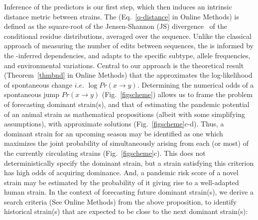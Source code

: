 \documentclass[onecolumn, compsoc,10pt]{IEEEtran}
\def\METHODS{Online Methods\xspace}
\begin{document}
Inference of the \enet predictors is our first step, which then induces  an intrinsic distance metric between strains. The \qdist  (Eq.~\eqref{q-distance} in \METHODS) is defined as the square-root of the Jensen-Shannon (JS) divergence~\cite{cover} of the conditional residue distributions, averaged over the sequence. Unlike the classical approach of measuring the number of edits between sequences, the \qdist is informed by the \enet-inferred  dependencies, and adapts to the specific subtype, allele frequencies, and environmental variations. Central to our approach is the theoretical result (Theorem~\ref{thmbnd} in \METHODS) that the \qdist  approximates the log-likelihood of spontaneous change $i.e.$ $\log Pr(x \rightarrow y )$. %
Determining the numerical odds of a spontaneous jump $ Pr(x \rightarrow y)$ (Fig.~\ref{figscheme}) allows us to frame the problem of forecasting  dominant strain(s), and that of estimating the  pandemic potential of an animal strain as  mathematical propositions (albeit with some simplifying assumptions), with  approximate solutions (Fig.~\ref{figscheme}c-d). Thus,  a dominant strain for an upcoming  season may be identified as one which maximizes the joint probability of simultaneously arising from each (or most)  of the currently circulating strains (Fig.~\ref{figscheme}c).  This does not deterministically specify the dominant strain, but a strain satisfying this criterion  has  high odds of acquiring dominance. And, a pandemic risk score of a novel strain may be estimated by the probability of it giving rise to a well-adapted human strain. In the context of  forecasting  future dominant strain(s),  we derive a search criteria (See \METHODS) from the above proposition, to identify  historical strain(s) that are  expected to be close to the next dominant strain(s):
\end{document}
